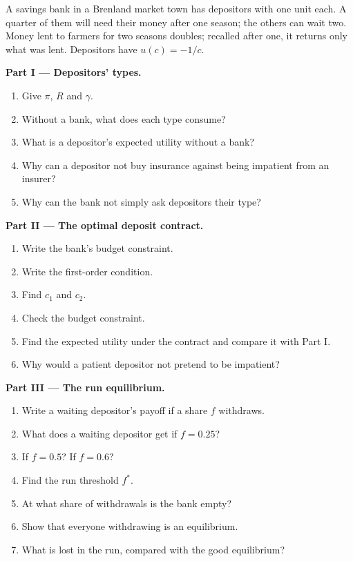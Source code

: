 \begin{problem}
\label{pb:b2:banks-and-crises:1}
A savings bank in a Brenland market town has depositors with one unit each. A quarter of them will need their money after
one season; the others can wait two. Money lent to farmers for two seasons doubles; recalled after one, it returns only what
was lent. Depositors have $u(c) = -1/c$.

\medskip
\noindent\textbf{Part I --- Depositors' types.}
\begin{enumerate}
  \item Give $\pi$, $R$ and $\gamma$.
  \item Without a bank, what does each type consume?
  \item What is a depositor's expected utility without a bank?
  \item Why can a depositor not buy insurance against being impatient from an insurer?
  \item Why can the bank not simply ask depositors their type?
\end{enumerate}

\medskip
\noindent\textbf{Part II --- The optimal deposit contract.}
\begin{enumerate}[resume]
  \item Write the bank's budget constraint.
  \item Write the first-order condition.
  \item Find $c_1$ and $c_2$.
  \item Check the budget constraint.
  \item Find the expected utility under the contract and compare it with Part I.
  \item Why would a patient depositor not pretend to be impatient?
\end{enumerate}

\medskip
\noindent\textbf{Part III --- The run equilibrium.}
\begin{enumerate}[resume]
  \item Write a waiting depositor's payoff if a share $f$ withdraws.
  \item What does a waiting depositor get if $f = 0.25$?
  \item If $f = 0.5$? If $f = 0.6$?
  \item Find the run threshold $f^*$.
  \item At what share of withdrawals is the bank empty?
  \item Show that everyone withdrawing is an equilibrium.
  \item What is lost in the run, compared with the good equilibrium?
\end{enumerate}


\end{problem}

